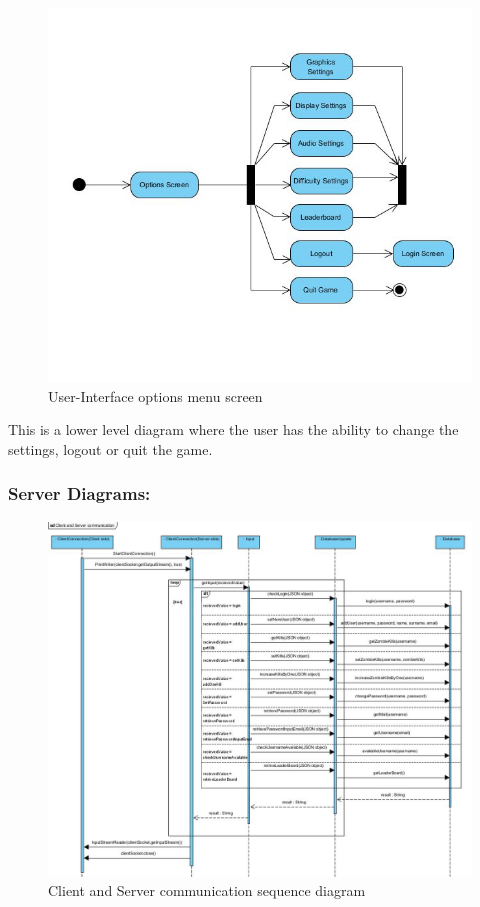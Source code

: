 \documentclass[letterpaper]{article}
\begin{document}
					\begin{figure}[H]
					\centering
					\includegraphics[width=180mm]{UML_Diagram/Activity/optionsscreen.jpg}
					\caption{User-Interface options menu screen}
					\label{overflow}
					\end{figure}
					This is a lower level diagram where the user has the ability to change the settings, logout or quit the game.
				
				\subsubsection*{Server Diagrams:}
				\vspace{0.1in}
				
					\begin{figure}[H]
					\centering
					\includegraphics[width=180mm]{UML_Diagram/Sequence/Client_Server_Sequence_Diagram.jpg}
					\caption{Client and Server communication sequence diagram}
					\label{overflow}
					\end{figure}
			
\end{document}
